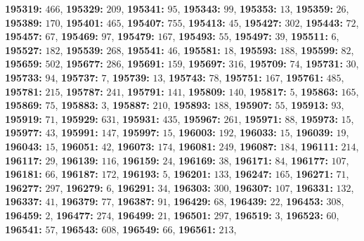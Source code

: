 \textsf{\bfseries 195319:} $466$, \textsf{\bfseries 195329:} $209$, \textsf{\bfseries 195341:} $95$, \textsf{\bfseries 195343:} $99$, \textsf{\bfseries 195353:} $13$, \textsf{\bfseries 195359:} $26$, \textsf{\bfseries 195389:} $170$, \textsf{\bfseries 195401:} $465$, \textsf{\bfseries 195407:} $755$, \textsf{\bfseries 195413:} $45$, \textsf{\bfseries 195427:} $302$, \textsf{\bfseries 195443:} $72$, \textsf{\bfseries 195457:} $67$, \textsf{\bfseries 195469:} $97$, \textsf{\bfseries 195479:} $167$, \textsf{\bfseries 195493:} $55$, \textsf{\bfseries 195497:} $39$, \textsf{\bfseries 195511:} $6$, \textsf{\bfseries 195527:} $182$, \textsf{\bfseries 195539:} $268$, \textsf{\bfseries 195541:} $46$, \textsf{\bfseries 195581:} $18$, \textsf{\bfseries 195593:} $188$, \textsf{\bfseries 195599:} $82$, \textsf{\bfseries 195659:} $502$, \textsf{\bfseries 195677:} $286$, \textsf{\bfseries 195691:} $159$, \textsf{\bfseries 195697:} $316$, \textsf{\bfseries 195709:} $74$, \textsf{\bfseries 195731:} $30$, \textsf{\bfseries 195733:} $94$, \textsf{\bfseries 195737:} $7$, \textsf{\bfseries 195739:} $13$, \textsf{\bfseries 195743:} $78$, \textsf{\bfseries 195751:} $167$, \textsf{\bfseries 195761:} $485$, \textsf{\bfseries 195781:} $215$, \textsf{\bfseries 195787:} $241$, \textsf{\bfseries 195791:} $141$, \textsf{\bfseries 195809:} $140$, \textsf{\bfseries 195817:} $5$, \textsf{\bfseries 195863:} $165$, \textsf{\bfseries 195869:} $75$, \textsf{\bfseries 195883:} $3$, \textsf{\bfseries 195887:} $210$, \textsf{\bfseries 195893:} $188$, \textsf{\bfseries 195907:} $55$, \textsf{\bfseries 195913:} $93$, \textsf{\bfseries 195919:} $71$, \textsf{\bfseries 195929:} $631$, \textsf{\bfseries 195931:} $435$, \textsf{\bfseries 195967:} $261$, \textsf{\bfseries 195971:} $88$, \textsf{\bfseries 195973:} $15$, \textsf{\bfseries 195977:} $43$, \textsf{\bfseries 195991:} $147$, \textsf{\bfseries 195997:} $15$, \textsf{\bfseries 196003:} $192$, \textsf{\bfseries 196033:} $15$, \textsf{\bfseries 196039:} $19$, \textsf{\bfseries 196043:} $15$, \textsf{\bfseries 196051:} $42$, \textsf{\bfseries 196073:} $174$, \textsf{\bfseries 196081:} $249$, \textsf{\bfseries 196087:} $184$, \textsf{\bfseries 196111:} $214$, \textsf{\bfseries 196117:} $29$, \textsf{\bfseries 196139:} $116$, \textsf{\bfseries 196159:} $24$, \textsf{\bfseries 196169:} $38$, \textsf{\bfseries 196171:} $84$, \textsf{\bfseries 196177:} $107$, \textsf{\bfseries 196181:} $66$, \textsf{\bfseries 196187:} $172$, \textsf{\bfseries 196193:} $5$, \textsf{\bfseries 196201:} $133$, \textsf{\bfseries 196247:} $165$, \textsf{\bfseries 196271:} $71$, \textsf{\bfseries 196277:} $297$, \textsf{\bfseries 196279:} $6$, \textsf{\bfseries 196291:} $34$, \textsf{\bfseries 196303:} $300$, \textsf{\bfseries 196307:} $107$, \textsf{\bfseries 196331:} $132$, \textsf{\bfseries 196337:} $41$, \textsf{\bfseries 196379:} $77$, \textsf{\bfseries 196387:} $91$, \textsf{\bfseries 196429:} $68$, \textsf{\bfseries 196439:} $22$, \textsf{\bfseries 196453:} $308$, \textsf{\bfseries 196459:} $2$, \textsf{\bfseries 196477:} $274$, \textsf{\bfseries 196499:} $21$, \textsf{\bfseries 196501:} $297$, \textsf{\bfseries 196519:} $3$, \textsf{\bfseries 196523:} $60$, \textsf{\bfseries 196541:} $57$, \textsf{\bfseries 196543:} $608$, \textsf{\bfseries 196549:} $66$, \textsf{\bfseries 196561:} $213$, 
